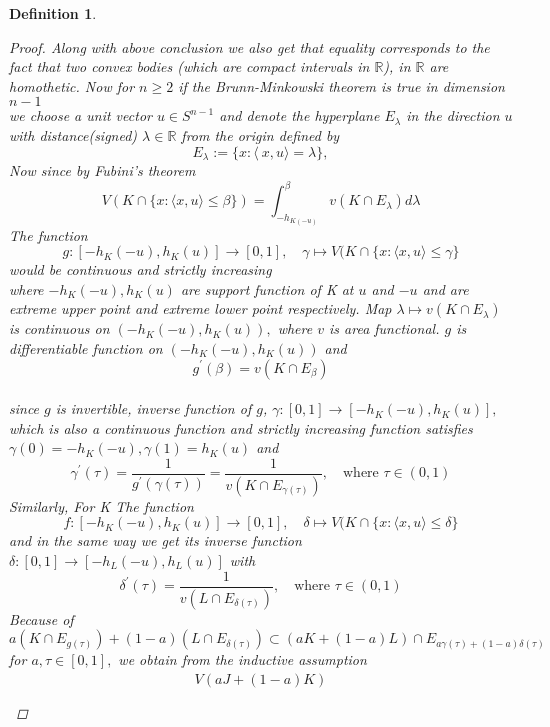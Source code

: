 \documentclass[oneside]{book}
\newtheorem{mydef}{Definition}
\begin{document}
\begin{mydef}
\begin{proof}
\hfill \break 
Along with above conclusion we also get that equality corresponds to the fact that two convex bodies (which are compact intervals in $\mathbb{R}$), in $\mathbb{R}$  are homothetic.
\hfill \break 
Now for $n \geq 2$ if the Brunn-Minkowski theorem is true in dimension $n-1 $
\\
we choose a unit vector $u \in S^{n-1}$ and denote 
the hyperplane $E_{\lambda}$ in the direction $u$ with  distance(signed) $\lambda \in \mathbb{R} $ from the origin defined by 
\[
E_{\lambda}:=\{x:\langle\ x, u\rangle=\lambda\}, 
\]
Now since by Fubini's theorem  
\[
V(K \cap\{x: \langle x, u\rangle \leq \beta\}) = \int_{-h_{ K(-u)}}^{\beta} v\left(K \cap E_{\lambda}\right) d \lambda
\] 
The function
\[
g:\left[-h_{K}(-u), h_{K}(u)\right] \rightarrow[0,1], \quad \gamma \mapsto V(K \cap\{x:\langle x, u\rangle \leq  \gamma \}
\]
would be  continuous and strictly increasing\\
where $-h_{K}(-u), h_{K}(u)$ are support function of K at $u$ and $-u$ and are extreme upper point and extreme lower point respectively.
\hfill \break
  Map $\lambda \mapsto v\left(K \cap E_{\lambda}\right)$ is continuous on $\left(-h_{K}(-u), h_{K}(u)\right),$ where $v$ is area functional.
   $g$ is differentiable function on $\left(-h_{K}(-u), h_{K}(u)\right)$ and $$g^{\prime}(\beta)=v\left(K \cap E_{\beta}\right)$$
  \\
  since $g$ is invertible, inverse function of $g$, $ \gamma:[0,1] \rightarrow\left[-h_{K}(-u), h_{K}(u)\right],$ which is also a continuous function and strictly increasing  function satisfies $ \gamma(0)=-h_{K}(-u),  \gamma(1)=h_{K}(u)$ and
\[
 \gamma^{\prime}(\tau)=\frac{1}{g^{\prime}( \gamma(\tau))}=\frac{1}{v\left(K \cap E_{ \gamma(\tau)}\right)}, \quad  \text{where } \tau \in(0,1)
\]
Similarly, For K
The function
\[
f:\left[-h_{K}(-u), h_{K}(u)\right] \rightarrow[0,1], \quad \delta \mapsto V(K \cap\{x:\langle x, u\rangle \leq  \delta \}
\]
and in the same way
we get its inverse function $ \delta:[0,1] \rightarrow\left[-h_{L}(-u), h_{L}(u)\right]$     with 
\[
\delta^{\prime}(\tau)=\frac{1}{v\left(L \cap E_{\delta(\tau)}\right)}, \quad  \text{where } \tau \in(0,1)
\]
Because of
\[
a\left(K \cap E_{g(\tau)}\right)+(1-a)\left(L \cap E_{\delta(\tau)}\right) \subset(a K+(1-a) L) \cap E_{a \gamma(\tau)+(1-a) \delta(\tau)}
\]
for $a, \tau \in[0,1],$ we obtain from the inductive assumption
\[
\begin{array}{l}
V(a J+(1-a) K) \\\\

\end{array}\]
\end{proof}
\end{mydef}
\end{document}
